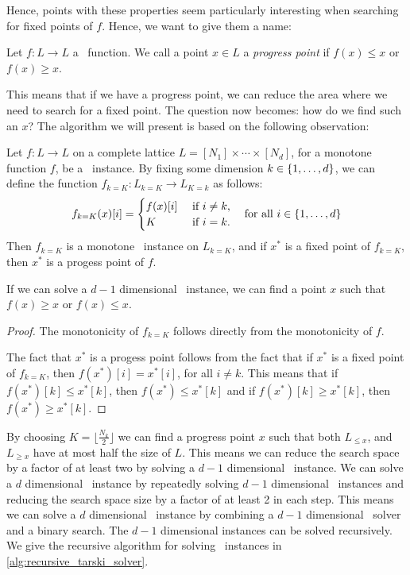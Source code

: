 Hence, points with these properties seem particularly interesting when searching for fixed points of $f$. Hence, we want to give them a name:
\begin{definition}
	Let $f : L \rightarrow L$ a \Tarski\ function. We call a point $x \in L$ a \emph{progress point} if $f(x) \leq x$ or $f(x) \geq x$.
\end{definition}
This means that if we have a progress point, we can reduce the area where we need to search for a fixed point. The question now becomes: how do we find such an $x$? The algorithm we will present is based on the following observation:
\begin{remark}
	Let $f : L \rightarrow L$ on a complete lattice ${L = [N_1] \times \cdots \times [N_d]}$, for a monotone function $f$, be a \Tarski\ instance. By fixing some dimension ${k \in \left\{1, \dots, d\right\}}$, we can define the function ${f_{k=K} : L_{k=K} \rightarrow L_{K=k}}$ as follows:
	\begin{align*}
		f_{k=K}(x)[i] = \begin{cases}
			                f(x)[i] & \text{ if } i \neq k, \\
			                K       & \text{ if } i = k.
		                \end{cases} \quad \text{for all $i \in \left\{1, \dots, d\right\}$}
	\end{align*}
	Then $f_{k=K}$ is a monotone \Tarski\ instance on $L_{k=K}$, and if $x^*$ is a fixed point of $f_{k=K}$, then $x^*$ is a progess point of $f$.
\end{remark}
If we can solve a $d-1$ dimensional \Tarski\ instance, we can find a point $x$ such that $f(x) \geq x$ or $f(x) \leq x$.
\begin{proof}
	The monotonicity of $f_{k=K}$ follows directly from the monotonicity of $f$. \par
	The fact that $x^*$ is a progess point follows from the fact that if $x^*$ is a fixed point of $f_{k=K}$, then $f(x^*)[i] = x^*[i]$, for all $i \neq k$. This means that if $f(x^*)[k] \leq x^*[k]$, then $f(x^*) \leq x^*[k]$ and if $f(x^*)[k] \geq x^*[k]$, then $f(x^*) \geq x^*[k]$.
\end{proof}
By choosing $K = \lfloor \frac{N_k}{2} \rfloor$ we can find a progress point $x$ such that both $L_{\leq x}$, and $L_{\geq x}$ have at most half the size of $L$. This means we can reduce the search space by a factor of at least two by solving a $d-1$ dimensional \Tarski\ instance. We can solve a $d$ dimensional \Tarski\ instance by repeatedly solving $d-1$ dimensional \Tarski\ instances and reducing the search space size by a factor of at least 2 in each step. This means we can solve a $d$ dimensional \Tarski\ instance by combining a $d-1$ dimensional \Tarski\ solver and a binary search. The $d-1$ dimensional instances can be solved recursively. We give the recursive algorithm for solving \Tarski\ instances in \cref{alg:recursive_tarski_solver}.
